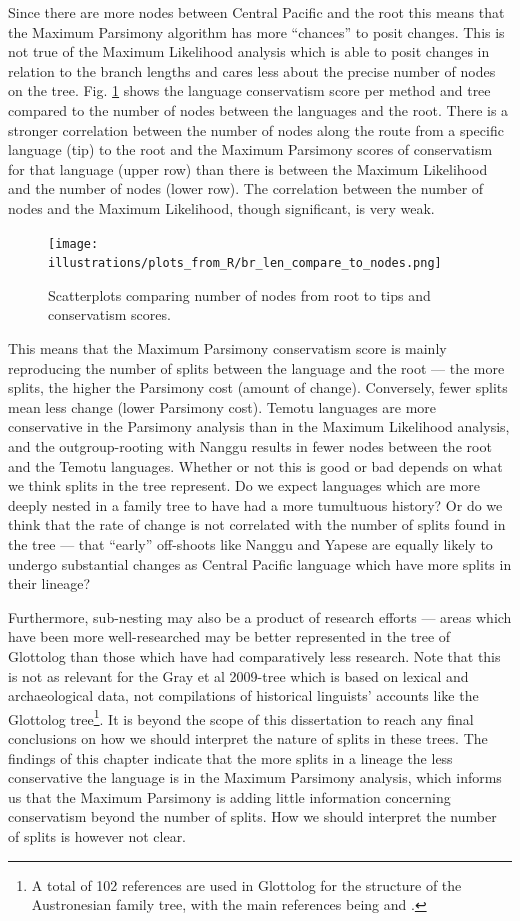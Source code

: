 \documentclass[draft,10pt]{article} %
\begin{document}
Since there are more nodes between Central Pacific and the root this means that the Maximum Parsimony algorithm has more ``chances'' to posit changes. This is not true of the Maximum Likelihood analysis which is able to posit changes in relation to the branch lengths and cares less about the precise number of nodes on the tree. Fig. \ref{BR_len_to_nnodes} shows the language conservatism score per method and tree compared to the number of nodes between the languages and the root. There is a stronger correlation between the number of nodes along the route from a specific language (tip) to the root and the Maximum Parsimony scores of conservatism for that language (upper row) than there is between the Maximum Likelihood and the number of nodes (lower row). The correlation between the number of nodes and the Maximum Likelihood, though significant, is very weak.

\begin{figure}[H]
\centering
\texttt{[image: illustrations/plots\_from\_R/br\_len\_compare\_to\_nodes.png]}
\caption{Scatterplots comparing number of nodes from root to tips and conservatism scores.}
\label{BR_len_to_nnodes}
\end{figure}

This means that the Maximum Parsimony conservatism score is mainly reproducing the number of splits between the language and the root --- the more splits, the higher the Parsimony cost (amount of change). Conversely, fewer splits mean less change (lower Parsimony cost). Temotu languages are more conservative in the Parsimony analysis than in the Maximum Likelihood analysis, and the outgroup-rooting with Nanggu results in fewer nodes between the root and the Temotu languages. Whether or not this is good or bad depends on what we think splits in the tree represent. Do we expect languages which are more deeply nested in a family tree to have had a more tumultuous history? Or do we think that the rate of change is not correlated with the number of splits found in the tree --- that ``early'' off-shoots like Nanggu and Yapese are equally likely to undergo substantial changes as Central Pacific language which have more splits in their lineage? 

Furthermore, sub-nesting may also be a product of research efforts --- areas which have been more well-researched may be better represented in the tree of Glottolog than those which have had comparatively less research. Note that this is not as relevant for the Gray et al 2009-tree which is based on lexical and archaeological data, not compilations of historical linguists' accounts like the Glottolog tree\footnote{A total of 102 references are used in Glottolog for the structure of the Austronesian family tree, with the main references being \citet{blust_2009, blust_2014} and \citet{blust_chen_2017}.}. It is beyond the scope of this dissertation to reach any final conclusions on how we should interpret the nature of splits in these trees. The findings of this chapter indicate that the more splits in a lineage the less conservative the language is in the Maximum Parsimony analysis, which informs us that the Maximum Parsimony is adding little information concerning conservatism beyond the number of splits. How we should interpret the number of splits is however not clear.
\end{document}
